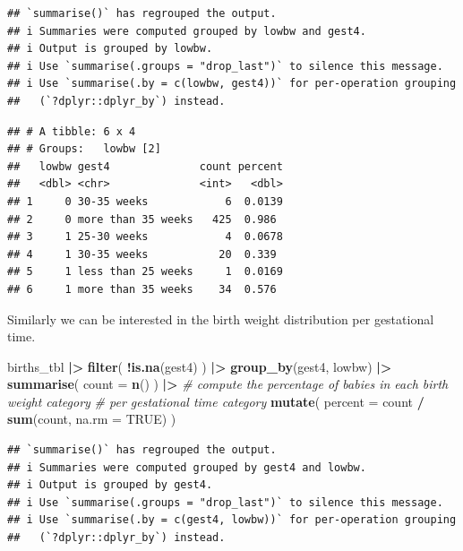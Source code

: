 \documentclass[
]{book}
\newenvironment{Shaded}{\begin{snugshade}}{\end{snugshade}}
\newcommand{\AttributeTok}[1]{\textcolor[rgb]{0.13,0.29,0.53}{#1}}
\newcommand{\CommentTok}[1]{\textcolor[rgb]{0.56,0.35,0.01}{\textit{#1}}}
\newcommand{\ConstantTok}[1]{\textcolor[rgb]{0.56,0.35,0.01}{#1}}
\newcommand{\FunctionTok}[1]{\textcolor[rgb]{0.13,0.29,0.53}{\textbf{#1}}}
\newcommand{\NormalTok}[1]{#1}
\newcommand{\SpecialCharTok}[1]{\textcolor[rgb]{0.81,0.36,0.00}{\textbf{#1}}}
\theoremstyle{definition}
\theoremstyle{definition}
\theoremstyle{definition}
\theoremstyle{definition}
\theoremstyle{remark}
\begin{document}
\begin{verbatim}
## `summarise()` has regrouped the output.
## i Summaries were computed grouped by lowbw and gest4.
## i Output is grouped by lowbw.
## i Use `summarise(.groups = "drop_last")` to silence this message.
## i Use `summarise(.by = c(lowbw, gest4))` for per-operation grouping
##   (`?dplyr::dplyr_by`) instead.
\end{verbatim}

\begin{verbatim}
## # A tibble: 6 x 4
## # Groups:   lowbw [2]
##   lowbw gest4              count percent
##   <dbl> <chr>              <int>   <dbl>
## 1     0 30-35 weeks            6  0.0139
## 2     0 more than 35 weeks   425  0.986 
## 3     1 25-30 weeks            4  0.0678
## 4     1 30-35 weeks           20  0.339 
## 5     1 less than 25 weeks     1  0.0169
## 6     1 more than 35 weeks    34  0.576
\end{verbatim}

Similarly we can be interested in the birth weight distribution per gestational time.

\begin{Shaded}
\begin{Highlighting}[]
\NormalTok{births\_tbl }\SpecialCharTok{|\textgreater{}}
  \FunctionTok{filter}\NormalTok{(}
    \SpecialCharTok{!}\FunctionTok{is.na}\NormalTok{(gest4)}
\NormalTok{  ) }\SpecialCharTok{|\textgreater{}}
  \FunctionTok{group\_by}\NormalTok{(gest4, lowbw) }\SpecialCharTok{|\textgreater{}}
  \FunctionTok{summarise}\NormalTok{(}
    \AttributeTok{count =} \FunctionTok{n}\NormalTok{()}
\NormalTok{  ) }\SpecialCharTok{|\textgreater{}}
  \CommentTok{\# compute the percentage of babies in each birth weight category}
  \CommentTok{\# per gestational time category}
  \FunctionTok{mutate}\NormalTok{(}
    \AttributeTok{percent =}\NormalTok{ count }\SpecialCharTok{/} \FunctionTok{sum}\NormalTok{(count, }\AttributeTok{na.rm =} \ConstantTok{TRUE}\NormalTok{)}
\NormalTok{  )}
\end{Highlighting}
\end{Shaded}

\begin{verbatim}
## `summarise()` has regrouped the output.
## i Summaries were computed grouped by gest4 and lowbw.
## i Output is grouped by gest4.
## i Use `summarise(.groups = "drop_last")` to silence this message.
## i Use `summarise(.by = c(gest4, lowbw))` for per-operation grouping
##   (`?dplyr::dplyr_by`) instead.
\end{verbatim}
\end{document}
